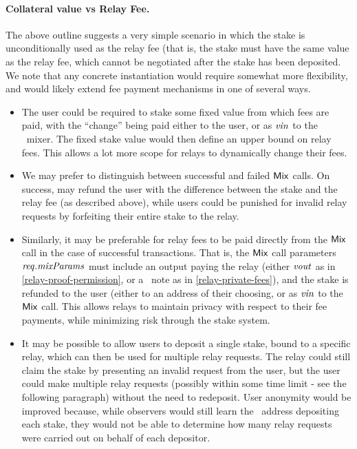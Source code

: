 \paragraph{Collateral value vs Relay Fee.} The above outline suggests a very simple scenario in which the stake is unconditionally used as the relay fee (that is, the stake must have the same value as the relay fee, which cannot be negotiated after the stake has been deposited. We note that any concrete instantiation would require somewhat more flexibility, and would likely extend fee payment mechanisms in one of several ways.
\begin{itemize}
\item The user could be required to stake some fixed value from which fees are paid, with the ``change'' being paid either to the user, or as $\mathit{vin}$ to the \zeth~mixer. The fixed stake value would then define an upper bound on relay fees. This allows a lot more scope for relays to dynamically change their fees.
\item We may prefer to distinguish between successful and failed $\mathsf{Mix}$ calls. On success, \stakecontract{} may refund the user with the difference between the stake and the relay fee (as described above), while users could be punished for invalid relay requests by forfeiting their entire stake to the relay.
\item Similarly, it may be preferable for relay fees to be paid directly from the $\mathsf{Mix}$ call in the case of successful transactions. That is, the $\mathsf{Mix}$ call parameters $\mathit{req}.\mathit{mixParams}$ must include an output paying the relay (either $\mathit{vout}$ as in \cref{relay-proof-permission}, or a \zeth~note as in \cref{relay-private-fees}), and the stake is refunded to the user (either to an address of their choosing, or as $\mathit{vin}$ to the $\mathsf{Mix}$ call. This allows relays to maintain privacy with respect to their fee payments, while minimizing risk through the stake system.
\item It may be possible to allow users to deposit a single stake, bound to a specific relay, which can then be used for multiple relay requests. The relay could still claim the stake by presenting an invalid request from the user, but the user could make multiple relay requests (possibly within some time limit - see the following paragraph) without the need to redeposit. User anonymity would be improved because, while observers would still learn the \ethereum~address depositing each stake, they would not be able to determine how many relay requests were carried out on behalf of each depositor.
\end{itemize}

